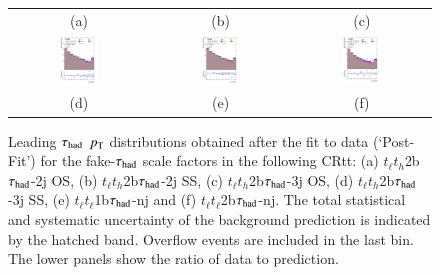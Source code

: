 \begin{figure}[H]
\begin{tabular}{@{}ccc@{}}
(a) & (b) & (c) \\
\includegraphics[page=1,width=0.29\textwidth]{figures/ttCR/tuH_reg1l1tau2b3j_ss_log_ttCR.pdf}&
\includegraphics[page=1,width=0.29\textwidth]{figures/ttCR/tuH_reg2l1tau1bnj_log_ttCR.pdf}&
\includegraphics[page=1,width=0.29\textwidth]{figures/ttCR/tuH_reg2l1tau2bnj_log_ttCR.pdf}\\
(d) & (e) & (f)\\
\end{tabular}
\caption{Leading $\tau_\text{had}$ $p_{\text{T}}$  distributions obtained after the fit to data (`Post-Fit') for the fake-$\tau_\text{had}$ scale factors in the following CRtt:
  (a) $t_{\ell}t_{h}$2b$\tau_\text{had}$-2j OS, (b) $t_{\ell}t_{h}$2b$\tau_\text{had}$-2j SS, (c) $t_{\ell}t_{h}$2b$\tau_\text{had}$-3j OS, (d) $t_{\ell}t_{h}$2b$\tau_\text{had}$-3j SS,
  (e) $t_{\ell}t_{\ell}$1b$\tau_\text{had}$-nj and (f) $t_{\ell}t_{\ell}$2b$\tau_\text{had}$-nj.
  The total statistical and systematic uncertainty of the background prediction is indicated by the hatched band.
  Overflow events are included in the last bin. The lower panels show the ratio of data to prediction.}
\label{fig:ttCR_mtt}
\end{figure}

